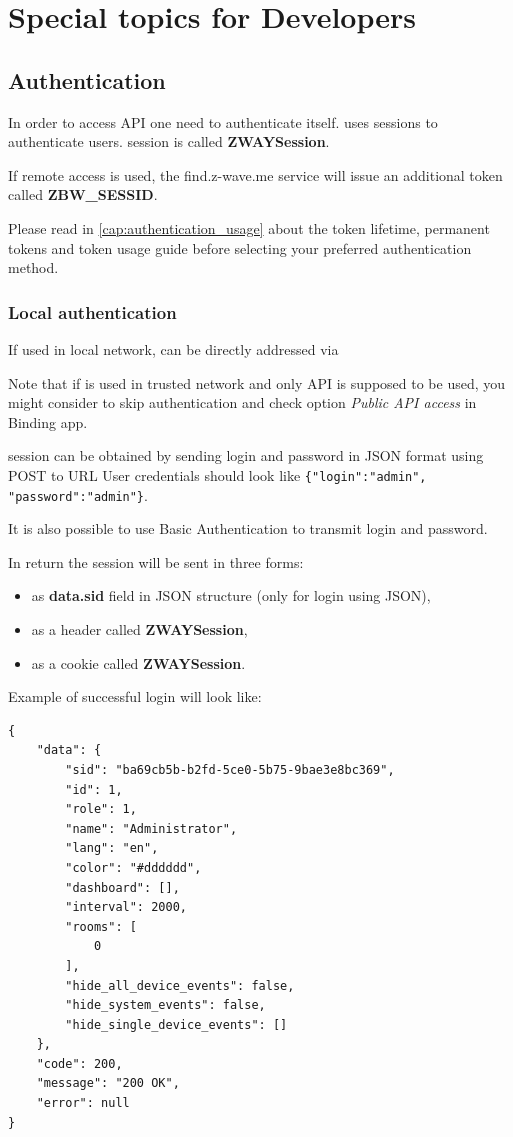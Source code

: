 \chapter{Special topics for Developers}

\section{Authentication}
\label{cap:authentication}

In order to access API one need to authenticate itself. \zway uses sessions
to authenticate users. \zway session is called \textbf{ZWAYSession}.

If remote access is used, the find.z-wave.me service will issue an additional token called \textbf{ZBW\_SESSID}.

Please read in \ref{cap:authentication_usage} about the token lifetime, permanent tokens and token usage guide before selecting your preferred authentication method.

\subsection{Local authentication}
\label{cap:authentication_local}

If used in local network, \zway can be directly addressed via 

Note that if \zway is used in trusted network and only \zwave API is supposed to be used, you might consider to skip authentication and check option \textit{Public API access} in \zwave Binding app.

\zway session can be obtained by sending login and password
in JSON format using POST to URL 
User credentials should look like \texttt{\{"login":"admin", "password":"admin"\}}.

It is also possible to use Basic Authentication to transmit login and password.

In return the session will be sent in three forms:
\begin{itemize}
\item as \textbf{data.sid} field in JSON structure (only for login using JSON),
\item as a header called \textbf{ZWAYSession},
\item as a cookie called \textbf{ZWAYSession}.
\end{itemize}

Example of successful login will look like:
\begin{lstlisting}[caption=Successful login reply,basicstyle=\small,columns=fullflexible]
{
    "data": {
        "sid": "ba69cb5b-b2fd-5ce0-5b75-9bae3e8bc369",
        "id": 1,
        "role": 1,
        "name": "Administrator",
        "lang": "en",
        "color": "#dddddd",
        "dashboard": [],
        "interval": 2000,
        "rooms": [
            0
        ],
        "hide_all_device_events": false,
        "hide_system_events": false,
        "hide_single_device_events": []
    },
    "code": 200,
    "message": "200 OK",
    "error": null
}
\end{lstlisting}

